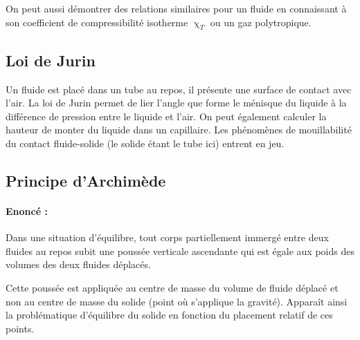 On peut aussi démontrer des relations similaires pour un fluide en connaissant à son coefficient de compressibilité isotherme $\upchi_T$ ou un gaz polytropique.

\subsection{Loi de Jurin}
Un fluide est placé dans un tube au repos, il présente une surface de contact avec l'air. La loi de Jurin permet de lier l'angle que forme le ménisque du liquide à la différence de pression entre le liquide et l'air. On peut également calculer la hauteur de monter du liquide dans un capillaire. Les phénomènes de mouillabilité du contact fluide-solide (le solide étant le tube ici) entrent en jeu.

\subsection{Principe d'Archimède}
\paragraph{Enoncé :}Dans une situation d'équilibre, tout corps partiellement immergé entre deux fluides au repos subit une poussée verticale ascendante qui est égale aux poids des volumes des deux fluides déplacés.

Cette poussée est appliquée au centre de masse du volume de fluide déplacé et non au centre de masse du solide (point où s'applique la gravité). Apparaît ainsi la problématique d'équilibre du solide en fonction du placement relatif de ces points.
